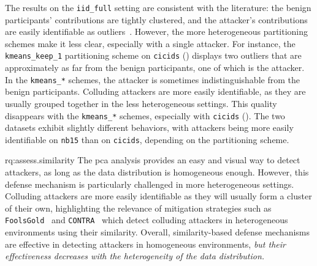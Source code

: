 The results on the \verb|iid_full| setting are consistent with the literature: the benign participants' contributions are tightly clustered, and the attacker's contributions are easily identifiable as outliers~\cite{tolpegin_DataPoisoningAttacks_2020}.
However, the more heterogeneous partitioning schemes make it less clear, especially with a single attacker.
For instance, the \verb|kmeans_keep_1| partitioning scheme on \texttt{cicids} () displays two outliers that are approximately as far from the benign participants, one of which is the attacker.
In the \verb|kmeans_*| schemes, the attacker is sometimes indistinguishable from the benign participants.
Colluding attackers are more easily identifiable, as they are usually grouped together in the less heterogeneous settings.
This quality disappears with the \verb|kmeans_*| schemes, especially with \texttt{cicids} ().
The two datasets exhibit slightly different behaviors, with attackers being more easily identifiable on \texttt{nb15} than on \texttt{cicids}, depending on the partitioning scheme.

\begin{answerbox}{rq:assess.similarity}
  The \gls{pca} analysis provides an easy and visual way to detect attackers, as long as the data distribution is homogeneous enough.
  However, this defense mechanism is particularly challenged in more heterogeneous settings.
  Colluding attackers are more easily identifiable as they will usually form a cluster of their own, highlighting the relevance of mitigation strategies such as \texttt{FoolsGold}~\cite{fung_LimitationsFederatedLearning_2020} and \texttt{CONTRA}~\cite{awan_CONTRADefendingPoisoning_2021} which detect colluding attackers in heterogeneous environments using their similarity.
  Overall, similarity-based defense mechanisms are effective in detecting attackers in homogeneous environments, \emph{but their effectiveness decreases with the heterogeneity of the data distribution.}
\end{answerbox}